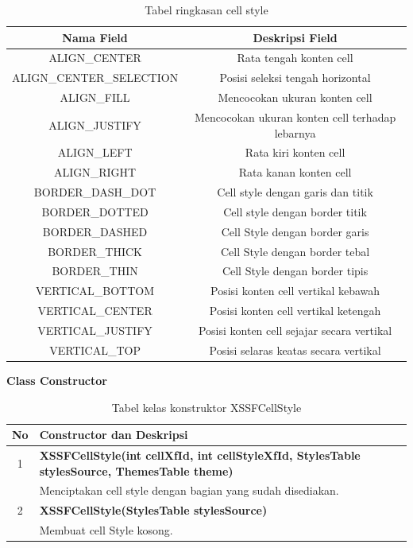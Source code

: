 \begin{table}[H]
		\centering
		\caption{Tabel ringkasan cell style}
		\label{tab:ringkasan_cell_style}
	\begin{tabular}{|c|c|}
		\hline
		\textbf{Nama Field} & \textbf{Deskripsi Field} \\ \hline \hline
		ALIGN\_CENTER & Rata tengah konten cell\\ \hline 
		ALIGN\_CENTER\_SELECTION &	Posisi seleksi tengah horizontal\\ \hline 
		ALIGN\_FILL & Mencocokan ukuran konten cell \\ \hline
		ALIGN\_JUSTIFY	&	Mencocokan ukuran konten cell terhadap lebarnya\\ \hline
		ALIGN\_LEFT	&	Rata kiri konten cell\\ \hline
		ALIGN\_RIGHT &	Rata kanan konten cell\\ \hline
		BORDER\_DASH\_DOT &	Cell style dengan garis dan titik \\ \hline
		BORDER\_DOTTED &	Cell style dengan border titik\\ \hline
		BORDER\_DASHED &	Cell Style dengan border garis\\ \hline
		BORDER\_THICK &	Cell Style dengan border tebal\\ \hline
		BORDER\_THIN &	Cell Style dengan border tipis\\ \hline
		VERTICAL\_BOTTOM &	Posisi konten cell vertikal kebawah\\ \hline
		VERTICAL\_CENTER &	Posisi konten cell vertikal ketengah\\ \hline
		VERTICAL\_JUSTIFY &	Posisi konten cell sejajar secara vertikal \\ \hline
		VERTICAL\_TOP &	Posisi selaras keatas secara vertikal\\ \hline
	\end{tabular}
\end{table}

\noindent \textbf{Class Constructor}
\begin{table}[H]
		\centering
		\caption{Tabel kelas konstruktor XSSFCellStyle}
		\label{tab:konstrukXSSFCellStyle}
	\begin{tabular}{|c|p{15cm}|}
		\hline
		\textbf{No} & \textbf{Constructor dan Deskripsi} \\ \hline \hline
		1 & \textbf{XSSFCellStyle(int cellXfId, int cellStyleXfId, StylesTable stylesSource, ThemesTable theme)}\\
			&	Menciptakan cell style dengan bagian yang sudah disediakan.\\ \hline
		2 & \textbf{XSSFCellStyle(StylesTable stylesSource)}\\
			&	Membuat cell Style kosong.\\ \hline 	
	\end{tabular}
\end{table}

